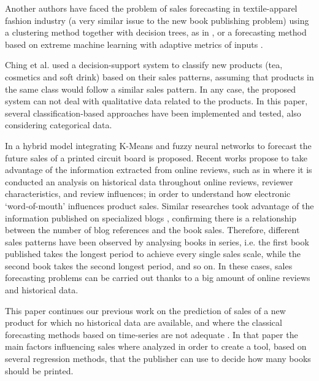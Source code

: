 \documentclass[a4paper,10pt,onecolumn,preprint,3p]{elsarticle}
\begin{document}
Another authors have faced the problem of sales forecasting in textile-apparel 
fashion industry (a very similar issue to the new book publishing problem) 
using a clustering method together with decision trees, as in \cite{SThomassey2014},  or a forecasting method based on extreme machine learning with adaptive metrics of inputs \cite{Xia2012}.

Ching et al. \cite{ChingChin2010} used a decision-support system to classify new 
products (tea, cosmetics and soft drink) based on their sales patterns, assuming 
that products in the same class would follow a similar sales pattern. 
In any case, the proposed system can not deal with qualitative data related to the products. 
In this paper, several classification-based approaches have been implemented and tested, also considering categorical data.



In \cite{Chang2009} a hybrid model integrating K-Means and fuzzy neural networks 
to forecast the future sales of a printed circuit board is proposed.
Recent works propose to take advantage of the information extracted from online reviews, such as in \cite{ChernWSF15} where it is conducted an analysis on historical data throughout online reviews, reviewer characteristics, and review influences; in order to understand how electronic `word-of-mouth' influences product sales.
Similar researches took advantage of the information published on specialized 
blogs \cite{Moon2010ICSSSM,Moon2010ICEC}, confirming there is a relationship between the number of blog references and the book sales. Therefore, different sales patterns have been observed by analysing books in series, i.e. the first book published takes the longest period to achieve every single sales scale, while the second book takes the second longest period, and so on.
In these cases, sales forecasting problems can be carried out thanks to a big 
amount of online reviews and historical data.


This paper continues our previous work on the prediction of sales of a new product for which no historical data are available, and where the classical forecasting methods based on time-series are not adequate \cite{Castillo2016books}. In that paper the main factors influencing sales where 
analyzed in order to create a tool, based on several regression methods, that the publisher can use to decide how many books should be printed.
\end{document}
